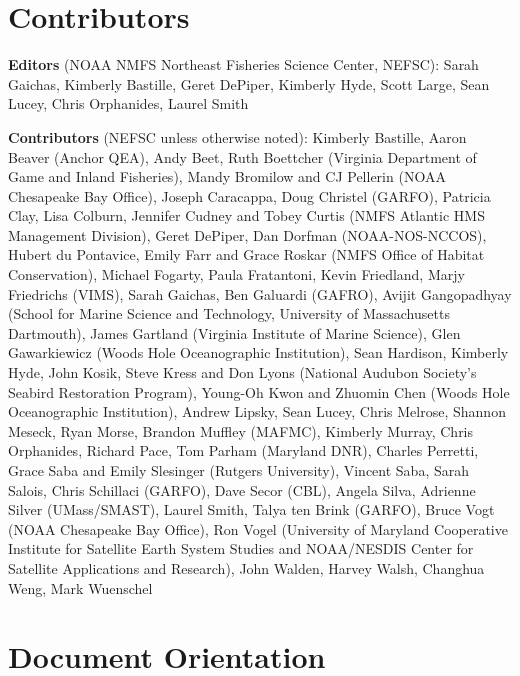 \documentclass[
  10pt,
]{article}
\begin{document}
\hypertarget{contributors}{%
\section{Contributors}\label{contributors}}

\textbf{Editors} (NOAA NMFS Northeast Fisheries Science Center, NEFSC):
Sarah Gaichas, Kimberly Bastille, Geret DePiper, Kimberly Hyde, Scott
Large, Sean Lucey, Chris Orphanides, Laurel Smith

\textbf{Contributors} (NEFSC unless otherwise noted): Kimberly Bastille,
Aaron Beaver (Anchor QEA), Andy Beet, Ruth Boettcher (Virginia
Department of Game and Inland Fisheries), Mandy Bromilow and CJ Pellerin
(NOAA Chesapeake Bay Office), Joseph Caracappa, Doug Christel (GARFO),
Patricia Clay, Lisa Colburn, Jennifer Cudney and Tobey Curtis (NMFS
Atlantic HMS Management Division), Geret DePiper, Dan Dorfman
(NOAA-NOS-NCCOS), Hubert du Pontavice, Emily Farr and Grace Roskar (NMFS
Office of Habitat Conservation), Michael Fogarty, Paula Fratantoni,
Kevin Friedland, Marjy Friedrichs (VIMS), Sarah Gaichas, Ben Galuardi
(GAFRO), Avijit Gangopadhyay (School for Marine Science and Technology,
University of Massachusetts Dartmouth), James Gartland (Virginia
Institute of Marine Science), Glen Gawarkiewicz (Woods Hole
Oceanographic Institution), Sean Hardison, Kimberly Hyde, John Kosik,
Steve Kress and Don Lyons (National Audubon Society's Seabird
Restoration Program), Young-Oh Kwon and Zhuomin Chen (Woods Hole
Oceanographic Institution), Andrew Lipsky, Sean Lucey, Chris Melrose,
Shannon Meseck, Ryan Morse, Brandon Muffley (MAFMC), Kimberly Murray,
Chris Orphanides, Richard Pace, Tom Parham (Maryland DNR), Charles
Perretti, Grace Saba and Emily Slesinger (Rutgers University), Vincent
Saba, Sarah Salois, Chris Schillaci (GARFO), Dave Secor (CBL), Angela
Silva, Adrienne Silver (UMass/SMAST), Laurel Smith, Talya ten Brink
(GARFO), Bruce Vogt (NOAA Chesapeake Bay Office), Ron Vogel (University
of Maryland Cooperative Institute for Satellite Earth System Studies and
NOAA/NESDIS Center for Satellite Applications and Research), John
Walden, Harvey Walsh, Changhua Weng, Mark Wuenschel

\newpage

\hypertarget{document-orientation}{%
\section{Document Orientation}\label{document-orientation}}
\end{document}
